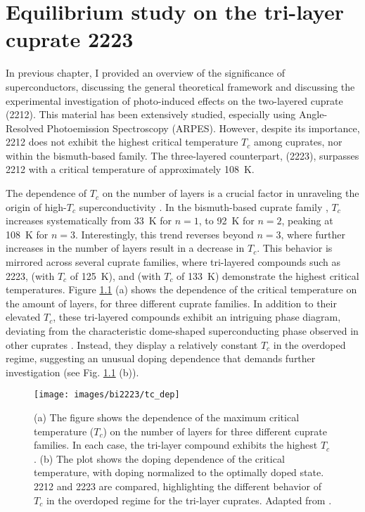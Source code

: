 \chapter{Equilibrium study on the tri-layer cuprate 2223}

In previous chapter, I provided an overview of the significance of superconductors, discussing the general theoretical framework and discussing the experimental investigation of photo-induced effects on the two-layered cuprate  (2212).
This material has been extensively studied, especially using Angle-Resolved Photoemission Spectroscopy (ARPES).
However, despite its importance, 2212 does not exhibit the highest critical temperature $T_c$ among cuprates, nor within the bismuth-based family.
The three-layered counterpart,  (2223), surpasses 2212 with a critical temperature of approximately \qty{108}{\kelvin}.

The dependence of $T_c$ on the number of  layers is a crucial factor in unraveling the origin of high-$T_c$ superconductivity \cite{feng_electronic_2002, scott_layer_1994, chakravarty_explanation_2004,iyo_tc_2007,chu_hole-doped_2015,luo_electronic_2023}.
In the bismuth-based cuprate family , $T_c$ increases systematically from \qty{33}{\kelvin} for $n=1$, to \qty{92}{\kelvin} for $n=2$, peaking at \qty{108}{\kelvin} for $n=3$.
Interestingly, this trend reverses beyond $n=3$, where further increases in the number of  layers result in a decrease in $T_c$.
This behavior is mirrored across several cuprate families, where tri-layered compounds such as 2223,  (with $T_c$ of \qty{125}{\kelvin}), and  (with $T_c$ of \qty{133}{\kelvin}) demonstrate the highest critical temperatures.
Figure \ref{fig:tcdep} (a) shows the dependence of the critical temperature on the amount of  layers, for three different cuprate families.
In addition to their elevated $T_c$, these tri-layered compounds exhibit an intriguing phase diagram, deviating from the characteristic dome-shaped superconducting phase observed in other cuprates \cite{fujii_doping_2002,piriou_effect_2008}.
Instead, they display a relatively constant $T_c$ in the overdoped regime, suggesting an unusual doping dependence that demands further investigation (see Fig. \ref{fig:tcdep} (b)).

\begin{figure}
	\centering
	\texttt{[image: images/bi2223/tc\_dep]}
	\caption{(a) The figure shows the dependence of the maximum critical temperature ($T_c$) on the number of  layers for three different cuprate families. In each case, the tri-layer compound exhibits the highest $T_c$. (b) The plot shows the doping dependence of the critical temperature, with doping normalized to the optimally doped state. 2212 and 2223 are compared, highlighting the different behavior of $T_c$ in the overdoped regime for the tri-layer cuprates. Adapted from \cite{luo_electronic_2023}.}
	\label{fig:tcdep}
\end{figure}


